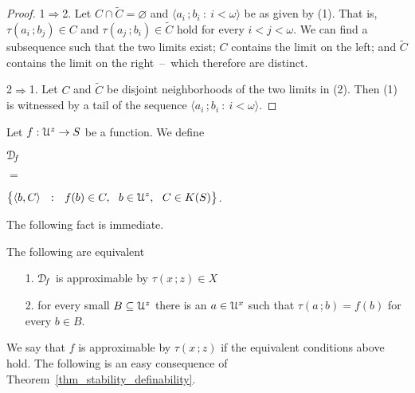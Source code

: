 \begin{proof}
  1$\Rightarrow$2.
  Let $C\cap\tilde C=\varnothing$ and $\langle a_i\,;b_i\ :\ i<\omega\rangle$ be as given by (1).
  That is, $\tau(a_i\,;b_j)\in C$ and $\tau(a_j\,;b_i)\in \tilde C$ hold for every $i<j<\omega$.
  We can find a subsequence such that the two limits exist; $C$ contains the limit on the left; and $\tilde C$ contains the limit on the right~--~which therefore are distinct.%

  2$\Rightarrow$1. Let $C$ and $\tilde C$ be disjoint neighborhoods of the two limits in (2).
  Then (1) is witnessed by a tail of the sequence $\langle a_i\,;b_i\ :\ i<\omega\rangle$.
\end{proof}


Let $f:{\EuScript U}^{z}\to S$ be a function.
We define
{\def\medrel#1{\parbox{5ex}{\hfil $#1$}}
\def\ceq#1#2#3{\parbox[t]{15ex}{$\displaystyle #1$}\medrel{#2}{$\displaystyle #3$}}

\ceq{\hfill{\EuScript D\!}_f}{=}{\big\{\langle b,C\rangle\ \ :\ \ f(b)\in C,\ \ b\in{\EuScript U}^{z},\ \ C\in K(S)\big\}}.}


The following fact is immediate.

\begin{fact}
  The following are equivalent
  \begin{itemize}
    \item [1.] ${\EuScript D\!}_f$ is approximable by $\tau(x\,;z)\in X$
    \item [2.] for every small $B\subseteq{\EuScript U}^z$ there is an $a\in{\EuScript U}^x$ such that $\tau(a\,;b)=f(b)$ for every $b\in B$.\smallskip
  \end{itemize}
\end{fact}

We say that $f$ is approximable by $\tau(x\,;z)$ if the equivalent conditions above hold.
The following is an easy consequence of Theorem~\ref{thm_stability_definability}.

\def\medrel#1{\parbox{5ex}{\hfil $#1$}}
\def\ceq#1#2#3{\parbox[t]{38ex}{$\displaystyle #1$}\medrel{#2}{$\displaystyle #3$}}

